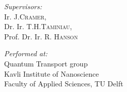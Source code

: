 \documentclass[a4paper,10pt]{report}
\begin{document}
\begin{minipage}{0.5\textwidth}
\begin{flushleft} \large
\emph{Supervisors:}\\
Ir. J.\textsc{Cramer}, \\
Dr. Ir. T.H.\textsc{Taminiau}, \\
Prof. Dr. Ir. R. \textsc{Hanson}
\end{flushleft}
\end{minipage}
\begin{minipage}{0.5\textwidth}
\begin{flushright} \large
\emph{Performed at:} \\
Quantum Transport group \\
Kavli Institute of Nanoscience \\
Faculty of Applied Sciences, TU Delft
\end{flushright}
\end{minipage}





\normalsize

\newpage
\end{document}
